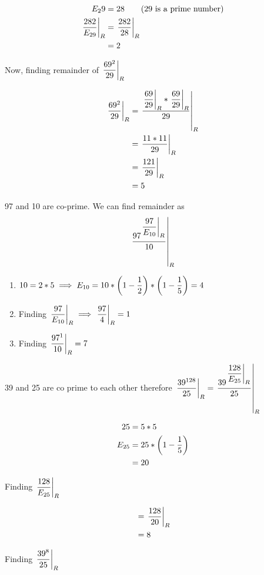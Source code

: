 \begin{align*}
    E_29 &= 28 \tag{29 is a prime number} \\
    \remFrac{282}{E_{29}} &= \remFrac{282}{28} \\
    &= 2
\end{align*}

Now, finding remainder of $\remFrac{69^{2}}{29}$

\begin{align*}
    \remFrac{69^{2}}{29} &= \remFrac{\remFrac{69}{29} * \remFrac{69}{29}}{29} \\
    &= \remFrac{11 * 11}{29} \\
    &= \remFrac{121}{29} \\
    &= 5 \\    
\end{align*}


97 and 10 are co-prime. We can find remainder as 
$$
    \remFrac{97 ^ {\remFrac{97}{E_{10}}}}{10}
$$

\begin{enumerate}
    \item $10 = 2 * 5 \implies E_{10} = 10 * \bigParen{1 - \dfrac{1}{2}} * \bigParen{1 - \dfrac{1}{5}} = 4$ 

    \item Finding $\remFrac{97}{E_{10}} \implies \remFrac{97}{4} = 1$ 

    \item Finding $\remFrac{97^1}{10} = 7$ 
\end{enumerate}


39 and 25 are co prime to each other therefore $\remFrac{39^{128}}{25} = \remFrac{39 ^ { \remFrac{128}{E_{25} } }  }{25}$

\begin{align*}
    25 &= 5 * 5 \\
    E_{25} &= 25 * \bigParen{1 - \dfrac{1}{5}} \\
    &= 20
\end{align*}

Finding $\remFrac{128}{E_{25} }$

\begin{align*}
    &= \remFrac{128}{20} \\
    &= 8
\end{align*}

Finding $\remFrac{39^{8}}{25}$ 

